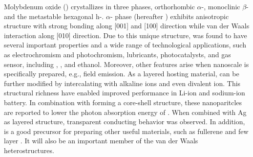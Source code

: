 Molybdenum oxide () crystallizes in three phases, orthorhombic $\alpha$-, monoclinic $\beta$- and the metastable hexagonal h-.\citep{Deb1968,Fibers2007} $\alpha$- phase (hereafter ) exhibits anisotropic structure with strong bonding along [001] and [100] direction while van der Waals interaction along [010] direction.\cite{He2003} Due to this unique structure,  was found to have several important properties and a wide range of technological applications, such as electrochromism and photochromism,\cite{Yao1992} lubricants,\cite{Sheehan1996} photocatalysts,\cite{Chen2010} and gas sensor, including ,\cite{Comini2005} ,\cite{Taurino2006} \cite{Sha2009} and ethanol.\cite{Choopun} Moreover, other features arise when nanoscale  is specifically prepared, e.g., field emission.\citep{Li2002d,Zhou2003b}  As a layered hosting material,  can be further modified by intercalating with alkaline ions\citep{Spahr1995,Li2006b,Hu2011} and even divalent ion.\cite{Sian2005} This structural richness have enabled improved performance in Li-ion\cite{Mai2007} and sodium-ion battery.\cite{Hariharan2013} In combination with  forming a core-shell structure, these nanoparitcles are reported to lower the photon absorption energy of .\cite{Elder2000} When combined with Ag as layered structure, transparent conducting behavior was observed.\cite{Nguyen2012} In addition,  is a good precursor for preparing other useful materials, such as  fullerene\cite{Li2003c} and few layer .\cite{Lin2012} It will also be an important member of the van der Waals heterostructures.\cite{Geim2013}


